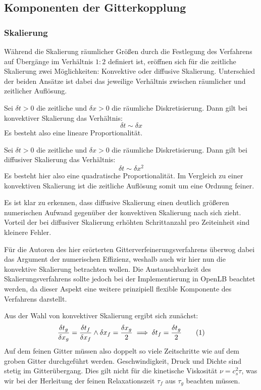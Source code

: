 \newpage
\subsection{Komponenten der Gitterkopplung}
\subsubsection{Skalierung}\label{kap:Skalierung}

Während die Skalierung räumlicher Größen durch die Festlegung des Verfahrens auf Übergänge im Verhältnis \(1:2\) definiert ist, eröffnen sich für die zeitliche Skalierung zwei Möglichkeiten: Konvektive oder diffusive Skalierung. Unterschied der beiden Ansätze ist dabei das jeweilige Verhältnis zwischen räumlicher und zeitlicher Auflösung.

\begin{Definition}
Sei \(\delta t > 0\) die zeitliche und \(\delta x > 0\) die räumliche Diskretisierung. Dann gilt bei konvektiver Skalierung das Verhältnis:
\[ \delta t \sim \delta x \]
Es besteht also eine lineare Proportionalität.
\end{Definition}

\begin{Definition}
Sei \(\delta t > 0\) die zeitliche und \(\delta x > 0\) die räumliche Diskretisierung. Dann gilt bei diffusiver Skalierung das Verhältnis:
\[ \delta t \sim \delta x^2 \]
Es besteht hier also eine quadratische Proportionalität. Im Vergleich zu einer konvektiven Skalierung ist die zeitliche Auflösung somit um eine Ordnung feiner.
\end{Definition}

Es ist klar zu erkennen, dass diffusive Skalierung einen deutlich größeren numerischen Aufwand gegenüber der konvektiven Skalierung nach sich zieht. Vorteil der bei diffusiver Skalierung erhöhten Schrittanzahl pro Zeiteinheit sind kleinere Fehler.

Für die Autoren des hier erörterten Gitterverfeinerungsverfahrens überwog dabei das Argument der numerischen Effizienz, weshalb auch wir hier nun die konvektive Skalierung betrachten wollen. Die Austauschbarkeit des Skalierungsverfahrens sollte jedoch bei der Implementierung in OpenLB beachtet werden, da dieser Aspekt eine weitere prinzipiell flexible Komponente des Verfahrens darstellt.

\bigskip

Aus der Wahl von konvektiver Skalierung ergibt sich zunächst:
\[\frac{\delta t_g}{\delta x_g} = \frac{\delta t_f}{\delta x_f} \land \delta x_f = \frac{\delta x_g}{2} \implies \delta t_f = \frac{\delta t_g}{2} \numberthis\label{eq:gridTime}\]
Auf dem feinen Gitter müssen also doppelt so viele Zeitschritte wie auf dem groben Gitter durchgeführt werden. Geschwindigkeit, Druck und Dichte sind stetig im Gitterübergang. Dies gilt nicht für die kinetische Viskosität \(\nu = c_s^2 \tau\), was wir bei der Herleitung der feinen Relaxationszeit \(\tau_f\) aus \(\tau_g\) beachten müssen.

